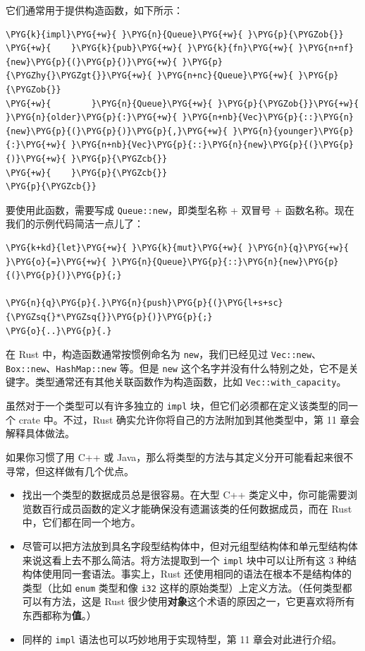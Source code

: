 它们通常用于提供构造函数，如下所示：

\begin{Verbatim}[commandchars=\\\{\},breaklines=true,breakanywhere=true,fontsize=\codefont,xleftmargin=17bp]
\PYG{k}{impl}\PYG{+w}{ }\PYG{n}{Queue}\PYG{+w}{ }\PYG{p}{\PYGZob{}}
\PYG{+w}{    }\PYG{k}{pub}\PYG{+w}{ }\PYG{k}{fn}\PYG{+w}{ }\PYG{n+nf}{new}\PYG{p}{(}\PYG{p}{)}\PYG{+w}{ }\PYG{p}{\PYGZhy{}\PYGZgt{}}\PYG{+w}{ }\PYG{n+nc}{Queue}\PYG{+w}{ }\PYG{p}{\PYGZob{}}
\PYG{+w}{        }\PYG{n}{Queue}\PYG{+w}{ }\PYG{p}{\PYGZob{}}\PYG{+w}{ }\PYG{n}{older}\PYG{p}{:}\PYG{+w}{ }\PYG{n+nb}{Vec}\PYG{p}{::}\PYG{n}{new}\PYG{p}{(}\PYG{p}{)}\PYG{p}{,}\PYG{+w}{ }\PYG{n}{younger}\PYG{p}{:}\PYG{+w}{ }\PYG{n+nb}{Vec}\PYG{p}{::}\PYG{n}{new}\PYG{p}{(}\PYG{p}{)}\PYG{+w}{ }\PYG{p}{\PYGZcb{}}
\PYG{+w}{    }\PYG{p}{\PYGZcb{}}
\PYG{p}{\PYGZcb{}}
\end{Verbatim}

要使用此函数，需要写成 \texttt{Queue::new}，即类型名称 + 双冒号 + 函数名称。现在我们的示例代码简洁一点儿了：

\begin{Verbatim}[commandchars=\\\{\},breaklines=true,breakanywhere=true,fontsize=\codefont,xleftmargin=17bp]
\PYG{k+kd}{let}\PYG{+w}{ }\PYG{k}{mut}\PYG{+w}{ }\PYG{n}{q}\PYG{+w}{ }\PYG{o}{=}\PYG{+w}{ }\PYG{n}{Queue}\PYG{p}{::}\PYG{n}{new}\PYG{p}{(}\PYG{p}{)}\PYG{p}{;}

\PYG{n}{q}\PYG{p}{.}\PYG{n}{push}\PYG{p}{(}\PYG{l+s+sc}{\PYGZsq{}*\PYGZsq{}}\PYG{p}{)}\PYG{p}{;}
\PYG{o}{..}\PYG{p}{.}
\end{Verbatim}

在 Rust 中，构造函数通常按惯例命名为 \texttt{new}，我们已经见过 \texttt{Vec::new}、\texttt{Box::new}、\texttt{HashMap::new} 等。但是 \texttt{new} 这个名字并没有什么特别之处，它不是关键字。类型通常还有其他关联函数作为构造函数，比如 \texttt{Vec::with\_capacity}。

虽然对于一个类型可以有许多独立的 \texttt{impl} 块，但它们必须都在定义该类型的同一个 crate 中。不过，Rust 确实允许你将自己的方法附加到其他类型中，第 11 章会解释具体做法。

如果你习惯了用 C++ 或 Java，那么将类型的方法与其定义分开可能看起来很不寻常，但这样做有几个优点。

\begin{itemize}
\item 找出一个类型的数据成员总是很容易。在大型 C++ 类定义中，你可能需要浏览数百行成员函数的定义才能确保没有遗漏该类的任何数据成员，而在 Rust 中，它们都在同一个地方。
\item 尽管可以把方法放到具名字段型结构体中，但对元组型结构体和单元型结构体来说这看上去不那么简洁。将方法提取到一个 \texttt{impl} 块中可以让所有这 3 种结构体使用同一套语法。事实上，Rust 还使用相同的语法在根本不是结构体的类型（比如 \texttt{enum} 类型和像 \texttt{i32} 这样的原始类型）上定义方法。（任何类型都可以有方法，这是 Rust 很少使用\textbf{对象}这个术语的原因之一，它更喜欢将所有东西都称为\textbf{值}。）
\item 同样的 \texttt{impl} 语法也可以巧妙地用于实现特型，第 11 章会对此进行介绍。
\end{itemize}

